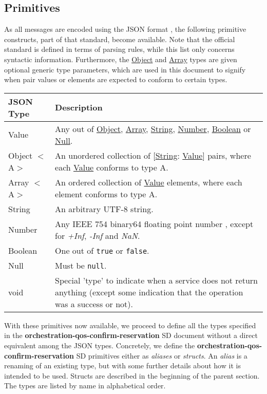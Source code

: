 \documentclass[a4paper]{arrowhead}
\newcommand{\pdef}[1]{{\textcolor{ArrowheadGrey}{#1 \label{sec:model:primitives:#1} \label{sec:model:primitives:#1s}}}}
\newcommand{\pref}[1]{{\textcolor{ArrowheadGrey}{\hyperref[sec:model:primitives:#1]{#1}}}}
\begin{document}
\clearpage

\subsection{Primitives}
\label{sec:model:primitives}

As all messages are encoded using the JSON format \cite{bray2014json}, the following primitive constructs, part of that standard, become available.
Note that the official standard is defined in terms of parsing rules, while this list only concerns syntactic information.
Furthermore, the \pref{Object} and \pref{Array} types are given optional generic type parameters, which are used in this document to signify when pair values or elements are expected to conform to certain types. 

\begin{table}[ht!]
\begin{tabularx}{\textwidth}{| p{3cm} | X |} \hline
\rowcolor{gray!33} JSON Type & Description \\ \hline
\pdef{Value}                 & Any out of \pref{Object}, \pref{Array}, \pref{String}, \pref{Number}, \pref{Boolean} or \pref{Null}. \\ \hline
\pdef{Object}$<$A$>$         & An unordered collection of $[$\pref{String}: \pref{Value}$]$ pairs, where each \pref{Value} conforms to type A. \\ \hline
\pdef{Array}$<$A$>$          & An ordered collection of \pref{Value} elements, where each element conforms to type A. \\ \hline
\pdef{String}                & An arbitrary UTF-8 string. \\ \hline
\pdef{Number}                & Any IEEE 754 binary64 floating point number \cite{cowlishaw2019floating}, except for \textit{+Inf}, \textit{-Inf} and \textit{NaN}. \\ \hline
\pdef{Boolean}               & One out of \texttt{true} or \texttt{false}. \\ \hline
\pdef{Null}                  & Must be \texttt{null}. \\ \hline
\pdef{void}             & Special 'type' to indicate when a service does not return anything (except some indication that the operation was a success or not). \\ \hline 
\end{tabularx}
\end{table}

With these primitives now available, we proceed to define all the types specified in the \textbf{orchestration-qos-confirm-reservation} SD document without a direct equivalent among the JSON types.
Concretely, we define the \textbf{orchestration-qos-confirm-reservation} SD primitives either as \textit{aliases} or \textit{structs}.
An \textit{alias} is a renaming of an existing type, but with some further details about how it is intended to be used.
Structs are described in the beginning of the parent section.
The types are listed by name in alphabetical order.
\end{document}
